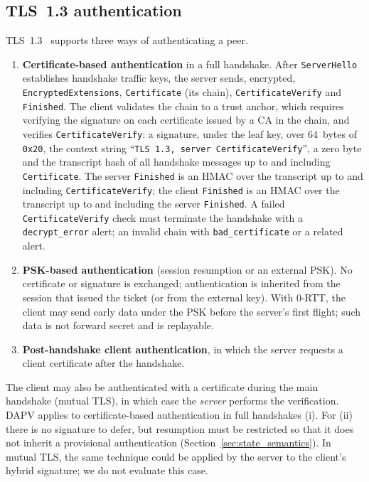 \documentclass[preprint,10pt,3p]{elsarticle}
\begin{document}
\subsection{TLS~1.3 authentication}
\label{sec:tls_auth}

TLS~1.3~\cite{RFC8446} supports three ways of authenticating a peer.
\begin{enumerate}[label=(\roman*), leftmargin=*]
\item \textbf{Certificate-based authentication} in a full handshake.  After
  \texttt{ServerHello} establishes handshake traffic keys, the server sends,
  encrypted, \texttt{EncryptedExtensions}, \texttt{Certificate} (its chain),
  \texttt{CertificateVerify} and \texttt{Finished}.  The client validates the
  chain to a trust anchor, which requires verifying the signature on each
  certificate issued by a CA in the chain, and verifies
  \texttt{CertificateVerify}: a signature, under the leaf key, over
  64~bytes of \texttt{0x20}, the context string ``\texttt{TLS 1.3, server
  CertificateVerify}'', a zero byte and the transcript hash of all
  handshake messages up to and including \texttt{Certificate}.  The server
  \texttt{Finished} is an HMAC over the transcript up to and including
  \texttt{CertificateVerify}; the client \texttt{Finished} is an HMAC over
  the transcript up to and including the server \texttt{Finished}.  A
  failed \texttt{CertificateVerify} check must terminate the handshake with
  a \texttt{decrypt\_error} alert; an invalid chain with
  \texttt{bad\_certificate} or a related alert.
\item \textbf{PSK-based authentication} (session resumption or an external
  PSK).  No certificate or signature is exchanged; authentication is
  inherited from the session that issued the ticket (or from the external
  key).  With 0-RTT, the client may send early data under the PSK before
  the server's first flight; such data is not forward secret and is
  replayable.
\item \textbf{Post-handshake client authentication}, in which the server
  requests a client certificate after the handshake.
\end{enumerate}
The client may also be authenticated with a certificate during the main
handshake (mutual TLS), in which case the \emph{server} performs the
verification.  DAPV applies to certificate-based authentication in full
handshakes (i).  For (ii) there is no signature to defer, but resumption
must be restricted so that it does not inherit a provisional authentication
(Section~\ref{sec:state_semantics}).  In mutual TLS, the same technique
could be applied by the server to the client's hybrid signature; we do not
evaluate this case.
\end{document}
